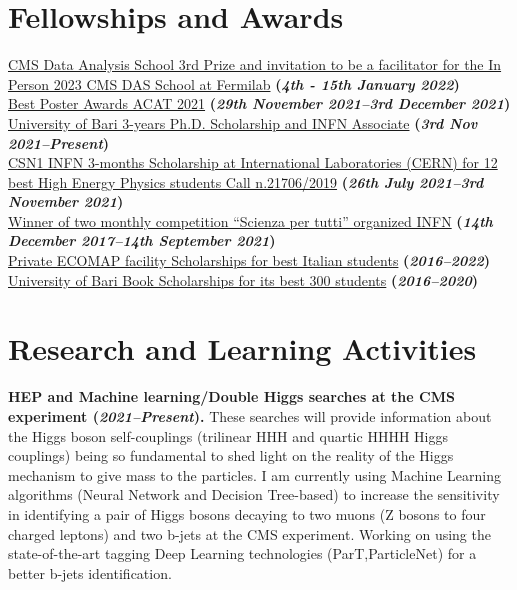 \documentclass[11pt]{res}
\newcommand{\MarginText}[1]{\section{#1}\vspace{10pt}}
\begin{document}
\begin{resume}
\MarginText{Fellowships and Awards}
\href{https://indico.cern.ch/event/1088671/}{CMS Data Analysis School 3rd Prize and invitation to be a facilitator for the In Person 2023 CMS DAS School at Fermilab} \textbf{(\textit{4th - 15th January 2022})}\\
\href{https://indico.cern.ch/event/855454/contributions/4596351/}{Best Poster Awards ACAT 2021} \textbf{(\textit{29th November 2021--3rd December 2021})}\\
\href{https://dottorato.fisica.uniba.it}{University of Bari 3-years Ph.D. Scholarship and INFN Associate} \textbf{(\textit{3rd Nov 2021--Present})}\\
\href{https://drive.google.com/file/d/1-3EpNjAJlxgwI7W7nlvAxtIPrqbM1Xud/view?usp=sharing}{CSN1 INFN 3-months Scholarship at International Laboratories (CERN) for 12 best High Energy Physics students Call n.21706/2019} \textbf{(\textit{26th July 2021--3rd November 2021})}\\
\href{https://scienzapertutti.infn.it/spazio-scuola/concorso-mensile-sxt}{Winner of two monthly competition “Scienza per tutti” organized INFN} \textbf{(\textit{14th December 2017--14th September 2021})}\\
\href{https://www.ecomap.it/news.asp?idNews=67}{Private ECOMAP facility Scholarships for best Italian students} \textbf{(\textit{2016--2022})}\\
\href{https://www.uniba.it/studenti/segreterie-studenti/amministrative/buoni-libro-per-studenti-meritevoli}{University of Bari Book Scholarships for its best 300 students} \textbf{(\textit{2016--2020})}\\

\MarginText{Research and Learning Activities}

\textbf{HEP and Machine learning/Double Higgs searches at the CMS experiment \textbf{(\textit{2021--Present})}.} These searches will provide information about the Higgs boson self-couplings (trilinear HHH and quartic HHHH Higgs couplings) being so fundamental to shed light on the reality of the Higgs mechanism to give mass to the particles. I am currently using Machine Learning algorithms (Neural Network and Decision Tree-based) to increase the sensitivity in identifying a pair of Higgs bosons decaying to two muons (Z bosons to four charged leptons) and two b-jets at the CMS experiment. Working on using the state-of-the-art tagging Deep Learning technologies (ParT,ParticleNet) for a better b-jets identification.


\end{resume}
\end{document}
